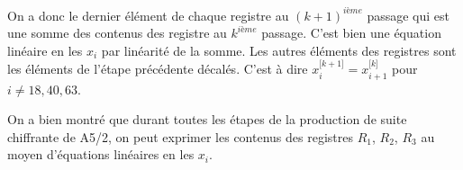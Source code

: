 On a donc le dernier élément de chaque registre au $(k+1)^{ième}$ passage qui est une somme des contenus des registre au $k^{ième}$ passage.
C'est bien une équation linéaire en les $x_i$ par linéarité de la somme.
Les autres éléments des registres sont les éléments de l'étape précédente décalés. C'est à dire $x^{\lbrack k+1\rbrack}_{i} = x^{\lbrack k\rbrack}_{i+1}$ pour $ i \neq 18, 40, 63$.

On a bien montré que durant toutes les étapes de la production de suite chiffrante de A5/2, on peut exprimer les contenus des registres $R_1$, $R_2$, $R_3$ au moyen d'équations linéaires en les $x_i$. 